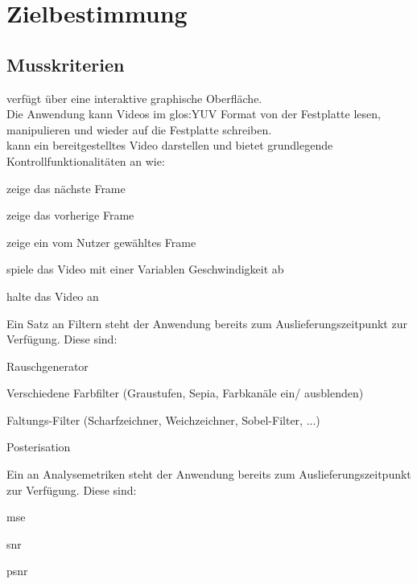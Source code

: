 \chapter{Zielbestimmung}

\section{Musskriterien}
\setcounter{counterKriterien}{0}
 \projektTitel verfügt über eine interaktive graphische Oberfläche.\\
 Die Anwendung kann Videos im \gls{glos:YUV} Format von der Festplatte lesen, manipulieren und wieder auf die Festplatte schreiben.\\
 \projektTitel kann ein bereitgestelltes Video darstellen und bietet grundlegende Kontrollfunktionalitäten an wie:
\begin{compactitem}
\item zeige das nächste Frame
\item zeige das vorherige Frame
\item zeige ein vom Nutzer gewähltes Frame
\item spiele das Video mit einer Variablen Geschwindigkeit ab
\item halte das Video an	
\end{compactitem} 
 Ein Satz an Filtern steht der Anwendung bereits zum Auslieferungszeitpunkt zur Verfügung. 
Diese sind:
\begin{compactitem}
\item Rauschgenerator
\item Verschiedene Farbfilter (Graustufen, Sepia, Farbkanäle ein/ ausblenden)
\item Faltungs-Filter (Scharfzeichner, Weichzeichner, Sobel-Filter, ...)
\item Posterisation
\end{compactitem}
 Ein an Analysemetriken steht der Anwendung bereits zum Auslieferungszeitpunkt zur Verfügung.
Diese sind:
\begin{compactitem}
\item \gls{mse}
\item \gls{snr}
\item \gls{psnr}
\end{compactitem}
